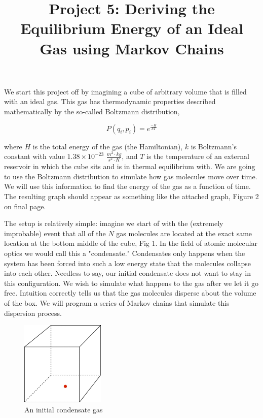 \documentclass[11pt]{amsart}
\title{Project 5: Deriving the Equilibrium Energy of an Ideal Gas using Markov Chains}
\begin{document}
\maketitle

We start this project off by imagining a cube of arbitrary volume that is filled with an ideal gas.  This gas has thermodynamic properties described mathematically by the so-called Boltzmann distribution, 

\begin{equation}
P(q_i,p_i)=e^{\frac{-H}{kT}}
\end{equation}
\vspace{2 mm}

where $H$ is the total energy of the gas (the Hamiltonian), $k$ is Boltzmann's constant with value $1.38 \times 10^{-23}$ $\frac{m^2 \cdot kg}{s^2 \cdot K}$, and $T$ is the temperature of an external reservoir in which the cube sits and is in thermal equilibrium with.  We are going to use the Boltzmann distribution to simulate how gas molecules move over time.  We will use this information to find the energy of the gas as a function of time.  The resulting graph should appear as something like the attached graph, Figure 2 on final page.
\newline

The setup is relatively simple: imagine we start of with the (extremely improbable) event that all of the $N$ gas molecules are located at the exact same location at the bottom middle of the cube, Fig 1.  In the field of atomic molecular optics we would call this a "condensate."  Condensates only happens when the system has been forced into such a low energy state that the molecules collapse into each other.  Needless to say, our initial condensate does not want to stay in this configuration.  We wish to simulate what happens to the gas after we let it go free.  Intuition correctly tells us that the gas molecules disperse about the volume of the box.  We will program a series of Markov chains that simulate this dispersion process.
\newline

\begin{figure}[ht!]
\centering
\includegraphics[width=40mm]{cube.jpg}
\caption{An initial condensate gas}
\label{overflow}
\end{figure}
\end{document}
